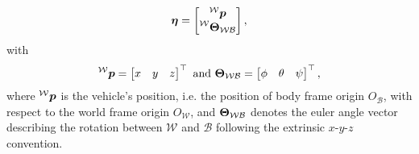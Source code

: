 \begin{equation}
	\etab = 
	\begin{bmatrix}
		\prescript{\mathcal{W}}{}{\pbo} \\
		\prescript{\mathcal{W}}{}{\Theb_{\mathcal{W}\mathcal{B}}}
	\end{bmatrix}
	,
\end{equation}
with
\begin{equation}
	\prescript{\mathcal{W}}{}{\mbox{$\bm{p}$}} = 
	\begin{bmatrix}
		x & y & z
	\end{bmatrix}^\top
	\text{ and }
	\mbox{$\bm{\Theta}$}_{\mathcal{W}\mathcal{B}} =
	\begin{bmatrix}
		\phi & \theta & \psi
	\end{bmatrix}^\top,
\end{equation}
where $\prescript{\mathcal{W}}{}{\mbox{$\bm{p}$}}$ is the vehicle's position, i.e. the position of body frame origin $O_\mathcal{B}$, with respect to the world frame origin $O_\mathcal{W}$, and $\mbox{$\bm{\Theta}$}_{\mathcal{W}\mathcal{B}}$ denotes the euler angle vector describing the rotation between $\mathcal{W}$ and $\mathcal{B}$ following the extrinsic $x$-$y$-$z$ convention.


